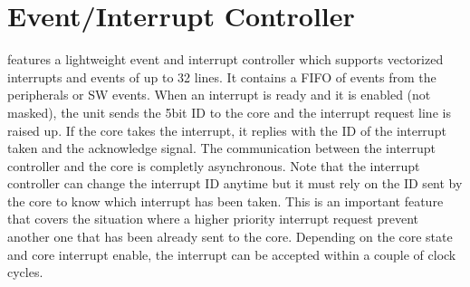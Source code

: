 \section{Event/Interrupt Controller}

\pulpissimo features a lightweight event and interrupt controller which supports
vectorized interrupts and events of up to 32 lines.
It contains a FIFO of events from the peripherals or SW events.
When an interrupt is ready and it is enabled (not masked), the unit sends the 5bit ID to the core and the interrupt request line is raised up. If the core takes the interrupt, it replies with the ID of the interrupt taken and the acknowledge signal. The communication between the interrupt controller and the core is completly asynchronous.
Note that the interrupt controller can change the interrupt ID anytime but it must rely
on the ID sent by the core to know which interrupt has been taken.
This is an important feature that covers the situation where a higher priority interrupt request prevent another one that has been already sent to the core.
Depending on the core state and core interrupt enable, the interrupt can be accepted within a couple of clock cycles.



